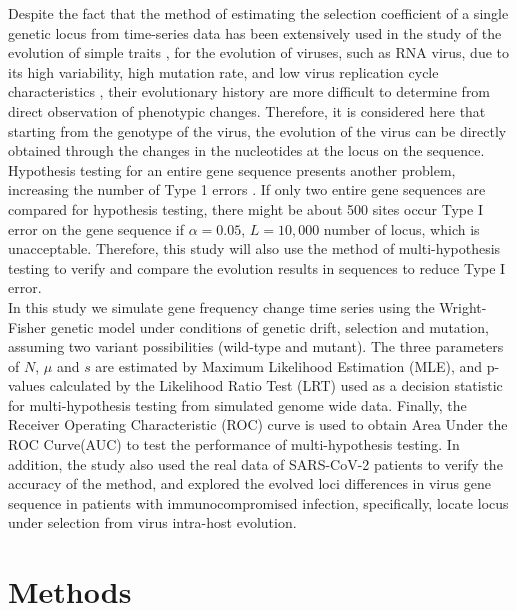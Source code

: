 \documentclass[12pt]{article}
\begin{document}
Despite the fact that the method of estimating the selection coefficient of a single genetic locus from time-series data has been extensively used in the study of the evolution of simple traits \citep{jewett2016effects}, for the evolution of viruses, such as RNA virus, due to its high variability, high mutation rate, and low virus replication cycle characteristics \citep{domingo1996basic}, their evolutionary history are more difficult to determine from direct observation of phenotypic changes. Therefore, it is considered here that starting from the genotype of the virus, the evolution of the virus can be directly obtained through the changes in the nucleotides at the locus on the sequence. Hypothesis testing for an entire gene sequence presents another problem, increasing the number of Type 1 errors \citep{goeman2014multiple}. If only two entire gene sequences are compared for hypothesis testing, there might be about 500 sites occur Type I error on the gene sequence if $\alpha =0.05$, $L= 10,000$ number of locus, which is unacceptable. Therefore, this study will also use the method of multi-hypothesis testing to verify and compare the evolution results in sequences to reduce Type I error.\\

In this study we simulate gene frequency change time series using the Wright-Fisher genetic model under conditions of genetic drift, selection and mutation, assuming two variant possibilities (wild-type and mutant). The three parameters of $N$, $\mu$ and $s$ are estimated by Maximum Likelihood Estimation (MLE), and p-values calculated by the Likelihood Ratio Test (LRT) used as a decision statistic for multi-hypothesis testing from simulated genome wide data. Finally, the Receiver Operating Characteristic (ROC) curve \citep{zweig1993receiver} is used to obtain Area Under the ROC Curve(AUC) to test the performance of multi-hypothesis testing. In addition, the study also used the real data of SARS-CoV-2 patients to verify the accuracy of the method, and explored the evolved loci differences in virus gene sequence in patients with immunocompromised \citep{choi2020persistence, clark2021sars, markov2023evolution} infection, specifically, locate locus under selection from virus intra-host evolution.\\

\newpage
\section{Methods}
\end{document}
